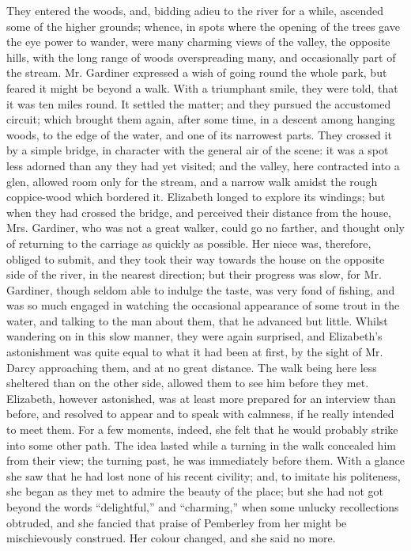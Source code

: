 \documentclass[12pt,openright]{book}
\begin{document}
They entered the woods, and, bidding adieu to the river for a while, ascended some of the higher grounds; whence, in spots where the opening of the trees gave the eye power to wander, were many charming views of the valley, the opposite hills, with the long range of woods overspreading many, and occasionally part of the stream. Mr. Gardiner expressed a wish of going round the whole park, but feared it might be beyond a walk. With a triumphant smile, they were told, that it was ten miles round. It settled the matter; and they pursued the accustomed circuit; which brought them again, after some time, in a descent among hanging woods, to the edge of the water, and one of its narrowest parts. They crossed it by a simple bridge, in character with the general air of the scene: it was a spot less adorned than any they had yet visited; and the valley, here contracted into a glen, allowed room only for the stream, and a narrow walk amidst the rough coppice-wood which bordered it. Elizabeth longed to explore its windings; but when they had crossed the bridge, and perceived their distance from the house, Mrs. Gardiner, who was not a great walker, could go no farther, and thought only of returning to the carriage as quickly as possible. Her niece was, therefore, obliged to submit, and they took their way towards the house on the opposite side of the river, in the nearest direction; but their progress was slow, for Mr. Gardiner, though seldom able to indulge the taste, was very fond of fishing, and was so much engaged in watching the occasional appearance of some trout in the water, and talking to the man about them, that he advanced but little. Whilst wandering on in this slow manner, they were again surprised, and Elizabeth’s astonishment was quite equal to what it had been at first, by the sight of Mr. Darcy approaching them, and at no great distance. The walk being here less sheltered than on the other side, allowed them to see him before they met. Elizabeth, however astonished, was at least more prepared for an interview than before, and resolved to appear and to speak with calmness, if he really intended to meet them. For a few moments, indeed, she felt that he would probably strike into some other path. The idea lasted while a turning in the walk concealed him from their view; the turning past, he was immediately before them. With a glance she saw that he had lost none of his recent civility; and, to imitate his politeness, she began as they met to admire the beauty of the place; but she had not got beyond the words “delightful,” and “charming,” when some unlucky recollections obtruded, and she fancied that praise of Pemberley from her might be mischievously construed. Her colour changed, and she said no more.
\end{document}
